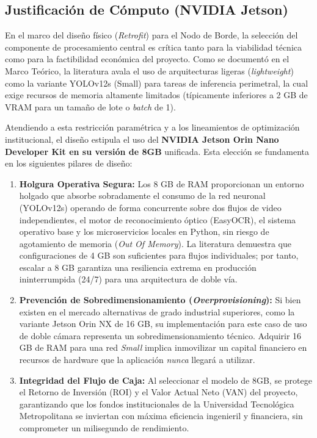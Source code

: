 \subsection{Justificación de Cómputo (NVIDIA Jetson)}

En el marco del diseño físico (\textit{Retrofit}) para el Nodo de Borde, la selección del componente de procesamiento central es crítica tanto para la viabilidad técnica como para la factibilidad económica del proyecto. Como se documentó en el Marco Teórico, la literatura avala el uso de arquitecturas ligeras (\textit{lightweight}) como la variante YOLOv12s (Small) para tareas de inferencia perimetral, la cual exige recursos de memoria altamente limitados (típicamente inferiores a 2 GB de VRAM para un tamaño de lote o \textit{batch} de 1).

Atendiendo a esta restricción paramétrica y a los lineamientos de optimización institucional, el diseño estipula el uso del \textbf{NVIDIA Jetson Orin Nano Developer Kit en su versión de 8GB} unificada. Esta elección se fundamenta en los siguientes pilares de diseño:

\begin{enumerate}
    \item \textbf{Holgura Operativa Segura:} Los 8 GB de RAM proporcionan un entorno holgado que absorbe sobradamente el consumo de la red neuronal (YOLOv12s) operando de forma concurrente sobre dos flujos de video independientes, el motor de reconocimiento óptico (EasyOCR), el sistema operativo base y los microservicios locales en Python, sin riesgo de agotamiento de memoria (\textit{Out Of Memory}). La literatura demuestra que configuraciones de 4 GB son suficientes para flujos individuales; por tanto, escalar a 8 GB garantiza una resiliencia extrema en producción ininterrumpida (24/7) para una arquitectura de doble vía.
    \item \textbf{Prevención de Sobredimensionamiento (\textit{Overprovisioning}):} Si bien existen en el mercado alternativas de grado industrial superiores, como la variante Jetson Orin NX de 16 GB, su implementación para este caso de uso de doble cámara representa un sobredimensionamiento técnico. Adquirir 16 GB de RAM para una red \textit{Small} implica inmovilizar un capital financiero en recursos de hardware que la aplicación \textit{nunca} llegará a utilizar.
    \item \textbf{Integridad del Flujo de Caja:} Al seleccionar el modelo de 8GB, se protege el Retorno de Inversión (ROI) y el Valor Actual Neto (VAN) del proyecto, garantizando que los fondos institucionales de la Universidad Tecnológica Metropolitana se inviertan con máxima eficiencia ingenieril y financiera, sin comprometer un milisegundo de rendimiento.
\end{enumerate}

